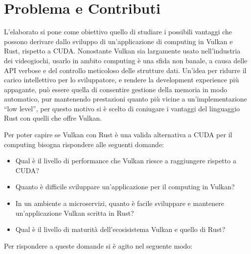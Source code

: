 \section[Problema e Contributi]{Problema e Contributi}


L'elaborato si pone come obiettivo quello di studiare i possibili vantaggi che possono derivare dallo sviluppo di un'applicazione di computing in Vulkan e Rust, rispetto a CUDA.
Nonostante Vulkan sia largamente usato nell'industria dei videogiochi, usarlo in ambito computing è una sfida non banale, a causa delle API verbose e del controllo meticoloso delle strutture dati. 
Un'idea per ridurre il carico intellettivo per lo sviluppatore, e rendere la development experience più appagante, può essere quella di consentire gestione della memoria in modo automatico, pur mantenendo prestazioni quanto più vicine a un'implementazione ``low level'', per questo motivo si è scelto di coniugare i vantaggi del linguaggio Rust con quelli che offre Vulkan. 

Per poter capire se Vulkan con Rust è una valida alternativa a CUDA per il computing bisogna rispondere alle seguenti domande:

\begin{itemize}
    \item Qual è il livello di performance che Vulkan riesce a raggiungere rispetto a CUDA? 
    \item Quanto è difficile sviluppare un'applicazione per il computing in Vulkan?
    \item In un ambiente a microservizi, quanto è facile sviluppare e mantenere un'applicazione Vulkan scritta in Rust? 
    \item Qual è il livello di maturità dell'ecosisistema Vulkan e quello di Rust?
\end{itemize}

Per rispondere a queste domande si è agito nel seguente modo:

